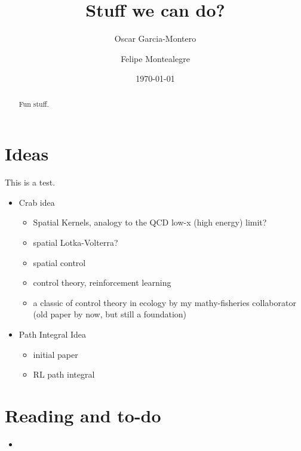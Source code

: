 \documentclass[aps,prd,twocolumn,notitlepage,nofootinbib,,nobibnotes,superscriptaddress,amsmath,amssymb,preprintnumbers]{revtex4-1}
\begin{document}
\date{\today}

\title{Stuff we can do?}

\author{Oscar Garcia-Montero}

\author{Felipe Montealegre}

         
\begin{abstract} 
Fun stuff.
\end{abstract}

\maketitle
\section{Ideas}
This is a test.
\label{sec:ideas}

\begin{itemize}
\item Crab idea 
\begin{itemize}
\item Spatial Kernels, analogy to the QCD low-x (high energy) limit?\cite{Mantysaari2013}
\item spatial Lotka-Volterra?
\cite{WU20194890} 
\item spatial control \cite{BONNEAU201615}
\item control theory, reinforcement learning \cite{lapeyrolerie2022deep,shastri2008optimal,bonneau2017optimal,bonneau2016spatially,montealegre2023pretty}
\item a classic of control theory in ecology by my mathy-fisheries collaborator (old paper by now, but still a foundation) \cite{walters1978ecological}
\end{itemize}

\item Path Integral Idea 
\begin{itemize}
\item initial paper \cite{Kappen_2005}
\item RL path integral \cite{theodorou2010generalized}
\end{itemize}

\end{itemize}
\section{Reading and to-do}
\label{sec:todo}

\begin{itemize}
\item 
\end{itemize}


\appendix 


\end{document}

